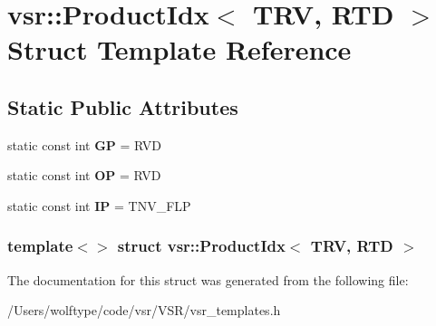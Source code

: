 \hypertarget{structvsr_1_1_product_idx_3_01_t_r_v_00_01_r_t_d_01_4}{\section{vsr\-:\-:Product\-Idx$<$ T\-R\-V, R\-T\-D $>$ Struct Template Reference}
\label{structvsr_1_1_product_idx_3_01_t_r_v_00_01_r_t_d_01_4}
}
\subsection*{Static Public Attributes}
\begin{DoxyCompactItemize}
\item 
\hypertarget{structvsr_1_1_product_idx_3_01_t_r_v_00_01_r_t_d_01_4_abcf6894a6f6cf82686cabaa330bf1576}{static const int {\bfseries G\-P} = R\-V\-D}\label{structvsr_1_1_product_idx_3_01_t_r_v_00_01_r_t_d_01_4_abcf6894a6f6cf82686cabaa330bf1576}

\item 
\hypertarget{structvsr_1_1_product_idx_3_01_t_r_v_00_01_r_t_d_01_4_a5935c90858861aa4a6a37872df1be13d}{static const int {\bfseries O\-P} = R\-V\-D}\label{structvsr_1_1_product_idx_3_01_t_r_v_00_01_r_t_d_01_4_a5935c90858861aa4a6a37872df1be13d}

\item 
\hypertarget{structvsr_1_1_product_idx_3_01_t_r_v_00_01_r_t_d_01_4_aa4d9ac760050e1fd123de22756438ac9}{static const int {\bfseries I\-P} = T\-N\-V\-\_\-\-F\-L\-P}\label{structvsr_1_1_product_idx_3_01_t_r_v_00_01_r_t_d_01_4_aa4d9ac760050e1fd123de22756438ac9}

\end{DoxyCompactItemize}
\subsubsection*{template$<$$>$ struct vsr\-::\-Product\-Idx$<$ T\-R\-V, R\-T\-D $>$}



The documentation for this struct was generated from the following file\-:\begin{DoxyCompactItemize}
\item 
/\-Users/wolftype/code/vsr/\-V\-S\-R/vsr\-\_\-templates.\-h\end{DoxyCompactItemize}
